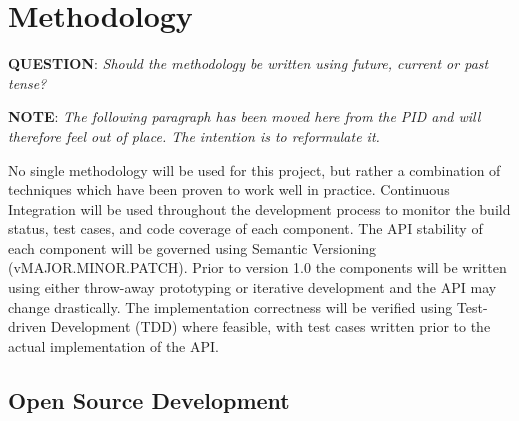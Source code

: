 

\section{Methodology}

\textbf{QUESTION}: \textit{Should the methodology be written using future, current or past tense?}



\textbf{NOTE}: \textit{The following paragraph has been moved here from the PID and will therefore feel out of place. The intention is to reformulate it.}

No single methodology will be used for this project, but rather a combination of techniques which have been proven to work well in practice. Continuous Integration will be used throughout the development process to monitor the build status, test cases, and code coverage of each component. The API stability of each component will be governed using Semantic Versioning (vMAJOR.MINOR.PATCH). Prior to version 1.0 the components will be written using either throw-away prototyping or iterative development and the API may change drastically. The implementation correctness will be verified using Test-driven Development (TDD) where feasible, with test cases written prior to the actual implementation of the API.




\subsection{Open Source Development}

